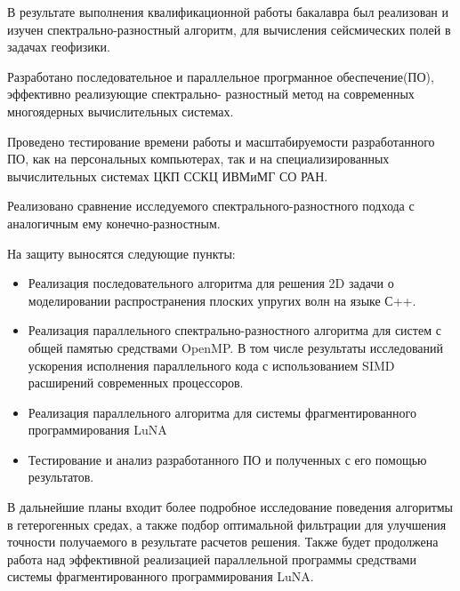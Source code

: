 
В результате выполнения квалификационной работы бакалавра был реализован и изучен спектрально-разностный алгоритм,
для вычисления сейсмических полей в задачах геофизики.

Разработано последовательное и параллельное прогрманное обеспечение(ПО), эффективно реализующие спектрально-
разностный метод на современных многоядерных вычислительных системах.

Проведено тестирование времени работы и масштабируемости разработанного ПО, как на персональных компьютерах,
так и на специализированных вычислительных системах ЦКП ССКЦ ИВМиМГ СО РАН.

Реализовано сравнение исследуемого спектрального-разностного подхода с аналогичным ему конечно-разностным.

На защиту выносятся следующие пункты:

\begin{itemize}
    \item Реализация последовательного алгоритма для решения 2D задачи о моделировании
    распространения плоских упругих волн на языке С++.
    \item Реализация параллельного спектрально-разностного алгоритма для систем с общей памятью средствами OpenMP. В том числе
    результаты исследований ускорения исполнения параллельного кода с использованием SIMD расширений современных процессоров.
    \item Реализация параллельного алгоритма для системы фрагментированного программирования LuNA
    \item Тестирование и анализ разработанного ПО и полученных с его помощью результатов.
\end{itemize}

В дальнейшие планы входит более подробное исследование поведения алгоритмы в гетерогенных средах,
а также подбор оптимальной фильтрации для улучшения точности получаемого в результате расчетов решения.
Также будет продолжена работа над эффективной реализацией параллельной программы
средствами системы фрагментированного программирования LuNA.

\clearpage